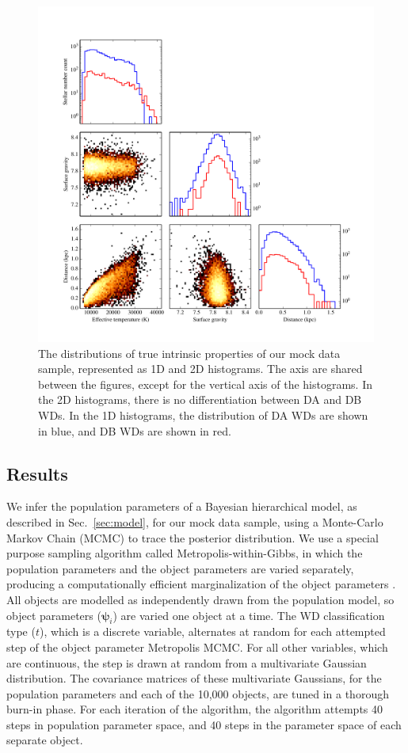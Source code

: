 \documentclass[fleqn,usenatbib]{mnras}
\newcommand{\objp}{\boldsymbol{\psi}}
\begin{document}
\begin{figure}
	\includegraphics[width=.9\textwidth]{10000WDs.pdf}
    \caption{The distributions of true intrinsic properties of our mock data sample, represented as 1D and 2D histograms. The axis are shared between the figures, except for the vertical axis of the histograms. In the 2D histograms, there is no differentiation between DA and DB WDs. In the 1D histograms, the distribution of DA WDs are shown in blue, and DB WDs are shown in red.}
    \label{fig:10000WDs}
\end{figure}



\subsection{Results}

We infer the population parameters of a Bayesian hierarchical model, as described in Sec.~\ref{sec:model}, for our mock data sample, using a Monte-Carlo Markov Chain (MCMC) to trace the posterior distribution. We use a special purpose sampling algorithm called Metropolis-within-Gibbs, in which the population parameters and the object parameters are varied separately, producing a computationally efficient marginalization of the object parameters \citep{BayesianDataAnalysis}. All objects are modelled as independently drawn from the population model, so object parameters ($\objp_i$) are varied one object at a time. The WD classification type ($t$), which is a discrete variable, alternates at random for each attempted step of the object parameter Metropolis MCMC. For all other variables, which are continuous, the step is drawn at random from a multivariate Gaussian distribution. The covariance matrices of these multivariate Gaussians, for the population parameters and each of the 10,000 objects, are tuned in a thorough burn-in phase. For each iteration of the algorithm, the algorithm attempts 40 steps in population parameter space, and 40 steps in the parameter space of each separate object.
\end{document}
